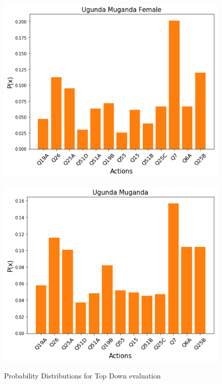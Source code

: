 {\begin{figure}[t!]
	\caption{Probability Distributions for Top Down evaluation}
	\begin{minipage}
		{0.32\textwidth}
		\includegraphics[width=\linewidth]{Images/botomupfemale.png}
		\label{fig:ugundamugandafemalebottomup}
	\end{minipage}\hfill
	\begin{minipage}{0.32\textwidth}
		\includegraphics[width=\linewidth]{Images/bottomup.png}
		\label{fig:ugundamugandamalebottomup}
	\end{minipage}\hfill
	\begin{minipage}{0.32\textwidth}%

\end{minipage}
\end{figure}}
